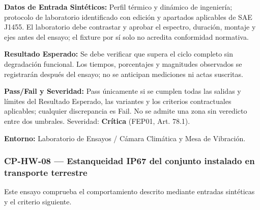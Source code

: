 \par\noindent \textbf{Datos de Entrada Sintéticos:} Perfil térmico y dinámico de ingeniería; protocolo de laboratorio identificado con edición y apartados aplicables de SAE J1455. El laboratorio debe contrastar y aprobar el espectro, duración, montaje y ejes antes del ensayo; el fixture por sí solo no acredita conformidad normativa.\par
\par\noindent \textbf{Resultado Esperado:} Se debe verificar que supera el ciclo completo sin degradación funcional. Los tiempos, porcentajes y magnitudes observados se registrarán después del ensayo; no se anticipan mediciones ni actas suscritas.\par
\par\noindent \textbf{Pass/Fail y Severidad:} Pass únicamente si se cumplen todas las salidas y límites del Resultado Esperado, las variantes y los criterios contractuales aplicables; cualquier discrepancia es Fail. No se admite una zona sin veredicto entre dos umbrales. Severidad: \textbf{Crítica} (FEP01, Art. 78.1).\par
\par\noindent \textbf{Entorno:} Laboratorio de Ensayos / Cámara Climática y Mesa de Vibración.\par


\subsubsection*{CP-HW-08 — Estanqueidad IP67 del conjunto instalado en transporte terrestre}\label{sec:9-cp-hw-08}
Este ensayo comprueba el comportamiento descrito mediante entradas sintéticas y el criterio siguiente.

